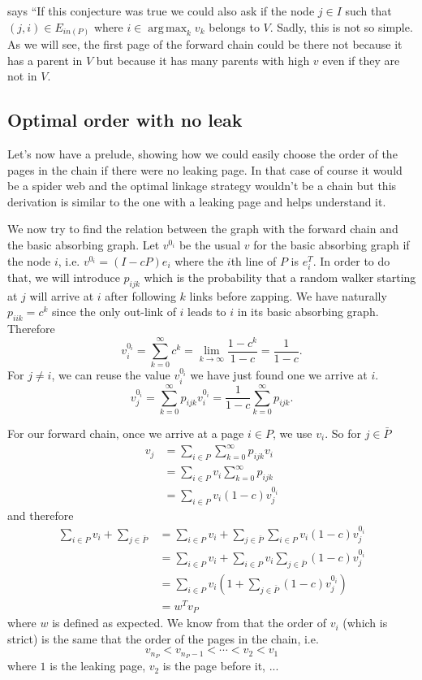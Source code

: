 \documentclass{article}
\DeclareMathOperator*{\argmax}{arg\,max}
\newcommand{\1}{\mathbf{1}}
\theoremstyle{definition}
\begin{document}
\cite{de2008maximizing} says
``If this conjecture was true we could also ask if the node $j \in I$ such that
$(j, i) \in E_{in(P)}$ where $i \in \argmax_k v_k$ belongs to $V$.
Sadly, this is not so simple. 
As we will see, the first page of the forward chain could be there not
because it has a parent in $V$ but because it has many parents with high $v$ even if they are not in $V$.

\subsection{Optimal order with no leak}
\label{sec:no_leak}
Let's now have a prelude, showing how we could easily choose the order of the pages in the chain if there were
no leaking page.
In that case of course it would be a spider web and the optimal linkage strategy wouldn't be a chain but this derivation is similar
to the one with a leaking page and helps understand it.

We now try to find the relation between the graph with the forward chain and the basic absorbing graph.
Let $v^{0_i}$ be the usual $v$ for the basic absorbing graph if the node $i$,
i.e. $v^{0_i} = (I - cP)e_i$ where the $i$th line of $P$ is $e_i^T$.
In order to do that, we will introduce $p_{ijk}$ which is the probability that a random walker starting at $j$
will arrive at $i$ after following $k$ links before zapping.
We have naturally $p_{iik} = c^k$ since the only out-link of $i$ leads to $i$ in its basic absorbing graph.
Therefore
\[ v_i^{0_i} = \sum_{k=0}^\infty c^k = \lim_{k \to \infty} \frac{1-c^k}{1-c} = \frac{1}{1-c}. \]
For $j \neq i$, we can reuse the value $v_i^{0_i}$ we have just found one we arrive at $i$.
\[ v_j^{0_i} = \sum_{k=0}^\infty p_{ijk} v_i^{0_i} = \frac{1}{1-c} \sum_{k=0}^\infty p_{ijk}. \]

For our forward chain,
once we arrive at a page $i \in P$, we use $v_i$.
So for $j \in \bar{P}$
\begin{align*}
  v_j & = \sum_{i \in P} \sum_{k = 0}^\infty p_{ijk} v_i\\
      & = \sum_{i \in P} v_i \sum_{k = 0}^\infty p_{ijk}\\
      & = \sum_{i \in P} v_i (1-c) v_j^{0_i}
\end{align*}
and therefore
\begin{align*}
  \sum_{i \in P} v_i + \sum_{j \in \bar{P}}
  & = \sum_{i \in P} v_i + \sum_{j \in \bar{P}} \sum_{i \in P} v_i (1-c) v_j^{0_i}\\
  & = \sum_{i \in P} v_i + \sum_{i \in P} v_i \sum_{j \in \bar{P}} (1-c) v_j^{0_i}\\
  & = \sum_{i \in P} v_i \left(1 + \sum_{j \in \bar{P}} (1-c) v_j^{0_i}\right)\\
  & = w^T v_P
\end{align*}
where $w$ is defined as expected.
We know from \cite{de2008maximizing} that the order of $v_i$ (which is strict) is the same that
the order of the pages in the chain, i.e.
\[ v_{n_P} < v_{n_P-1} < \cdots < v_2 < v_1 \]
where $1$ is the leaking page, $v_2$ is the page before it, ...
\end{document}
